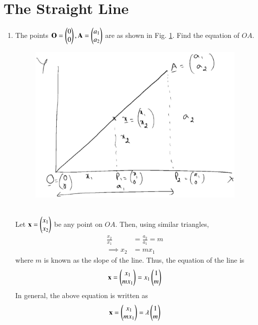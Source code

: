 \documentclass[journal,12pt,twocolumn]{IEEEtran}
\renewcommand\thesection{\arabic{section}}
\begin{document}
\section{The Straight Line}
\begin{enumerate}[label=\thesection.\arabic*
,ref=\thesection.\theenumi]
\item The points $\mathbf{O}=\begin{pmatrix}0\\0\end{pmatrix},\mathbf{A}=\begin{pmatrix}a_1\\a_2\end{pmatrix}$ are as shown in Fig. \ref{fig:line_homog}. 
Find the equation of  $OA$. 
\begin{figure}
\centering
\includegraphics[width=\columnwidth]{./figs/line_homog.eps}
\caption{}
\label{fig:line_homog}
\end{figure}
\\
\solution
Let $\mathbf{x}=\begin{pmatrix}x_1\\x_2\end{pmatrix}$ be any point on $OA$.
Then, using similar triangles,
\begin{align}
\frac{x_2}{x_1} &= \frac{a_2}{a_1} = m
\\
\implies x_2 &=  m x_1
\end{align}
where $m$ is known as the slope of the line. Thus, the equation of the line is
\begin{align}
\mathbf{x} = \begin{pmatrix}x_1\\m x_1\end{pmatrix} = x_1 \begin{pmatrix}1 \\ m\end{pmatrix}
\end{align}
In general, the above equation is written as
\begin{align}
\label{eq:homog}
\mathbf{x} = \begin{pmatrix}x_1\\m x_1\end{pmatrix} = \lambda \begin{pmatrix}1 \\ m\end{pmatrix}
\end{align}



\end{enumerate}
\end{document}
